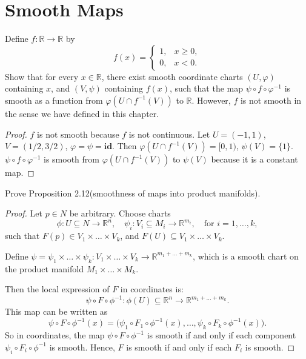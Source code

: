 \chapter{Smooth Maps}

\begin{problem}
    Define \( f : \mathbb{R} \to \mathbb{R} \) by
    \[
    f(x) =
    \begin{cases}
        1, & x \geq 0, \\
        0, & x < 0.
    \end{cases}
    \]
    Show that for every \( x \in \mathbb{R} \), there exist smooth coordinate charts \( (U, \varphi) \) containing \( x \), and \( (V, \psi) \) containing \( f(x) \), such that the map
    $\psi \circ f \circ \varphi^{-1}$
    is smooth as a function from \( \varphi(U \cap f^{-1}(V)) \) to \( \mathbb{R} \). However, \( f \) is not smooth in the sense we have defined in this chapter.
    \begin{proof}
        $f$ is not smooth because $f$ is not continuous. Let $U=(-1,1)$, $V=(1/2, 3/2)$, $\varphi = \psi = \textbf{id}$. Then $\varphi(U \cap f^{-1}(V)) = [0,1)$, $\psi(V) = \{1\}$. $\psi \circ f \circ \varphi^{-1}$ is smooth from $\varphi(U \cap f^{-1}(V))$ to $\psi(V)$ because it is a constant map.
    \end{proof}
\end{problem}

\begin{problem}
    Prove Proposition 2.12(smoothness of maps into product manifolds).
    \begin{proof}
        Let $p \in N$ be arbitrary. Choose charts 
        \[
        \phi : U \subseteq N \to \mathbb{R}^n, \quad \psi_i : V_i \subseteq M_i \to \mathbb{R}^{m_i}, \quad \text{for } i = 1, \dots, k,
        \]
        such that $F(p) \in V_1 \times \dots \times V_k$, and $F(U) \subseteq V_1 \times \dots \times V_k$.

        Define $\psi = \psi_1 \times \dots \times \psi_k : V_1 \times \dots \times V_k \to \mathbb{R}^{m_1 + \dots + m_k}$, which is a smooth chart on the product manifold $M_1 \times \dots \times M_k$.

        Then the local expression of $F$ in coordinates is:
        \[
        \psi \circ F \circ \phi^{-1} : \phi(U) \subseteq \mathbb{R}^n \to \mathbb{R}^{m_1 + \dots + m_k}.
        \]
        This map can be written as
        \[
        \psi \circ F \circ \phi^{-1}(x) = \big( \psi_1 \circ F_1 \circ \phi^{-1}(x), \dots, \psi_k \circ F_k \circ \phi^{-1}(x) \big).
        \]
        So in coordinates, the map $\psi \circ F \circ \phi^{-1}$ is smooth if and only if each component $\psi_i \circ F_i \circ \phi^{-1}$ is smooth. Hence, $F$ is smooth if and only if each $F_i$ is smooth.
    \end{proof}
\end{problem}

